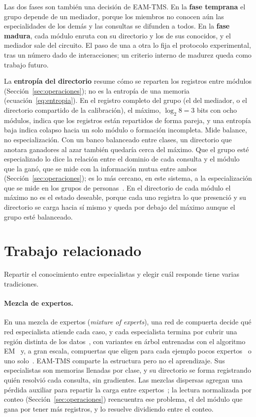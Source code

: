 Las dos fases son también una decisión de EAM-TMS.
En la \textbf{fase temprana} el grupo depende de un mediador, porque los miembros no
conocen aún las especialidades de los demás y las consultas se difunden a todos.
En la \textbf{fase madura}, cada módulo enruta con su directorio y los de sus
conocidos, y el mediador sale del circuito.
El paso de una a otra lo fija el protocolo experimental, tras un número dado de
interacciones; un criterio interno de madurez queda como trabajo futuro.

La \textbf{entropía del directorio} resume cómo se reparten los registros entre
módulos (Sección~\ref{sec:operaciones}); no es la entropía de una memoria
(ecuación~\eqref{eq:entropia}).
En el registro completo del grupo (el del mediador, o el directorio compartido de la
calibración), el máximo, $\log_2 8 = 3$ bits con ocho módulos, indica que los registros
están repartidos de forma pareja, y una entropía baja indica colapso hacia un solo
módulo o formación incompleta.
Mide balance, no especialización.
Con un banco balanceado entre clases, un directorio
que anotara ganadores al azar también quedaría cerca del máximo.
Que el grupo esté especializado lo dice la relación entre el dominio de cada consulta y
el módulo que la ganó, que se mide con la información mutua entre ambos
(Sección~\ref{sec:operaciones}); es lo más cercano, en este sistema, a la
especialización que se mide en los grupos de personas~\cite{austin2003transactive}.
En el directorio de cada módulo el máximo no es el estado deseable, porque cada uno
registra lo que presenció y su directorio se carga hacia sí mismo y queda por debajo del
máximo aunque el grupo esté balanceado.

\section{Trabajo relacionado}
\label{sec:trabajo-relacionado}

Repartir el conocimiento entre especialistas y elegir cuál responde tiene varias
tradiciones.

\paragraph{Mezcla de expertos.}
En una mezcla de expertos (\textit{mixture of experts}), una red de compuerta decide qué red
especialista atiende cada caso, y cada especialista termina por cubrir una región
distinta de los datos~\cite{jacobs1991adaptive}, con variantes en árbol entrenadas con el algoritmo
EM~\cite{jordan1994hierarchical} y, a gran escala, compuertas que eligen para cada
ejemplo pocos expertos~\cite{shazeer2017outrageously} o uno solo~\cite{fedus2022switch}.
EAM-TMS comparte la estructura pero no el aprendizaje.
Sus especialistas son memorias
llenadas por clase, y su directorio se forma registrando quién resolvió cada consulta,
sin gradientes.
Las mezclas dispersas agregan una pérdida auxiliar para repartir la carga entre
expertos~\cite{fedus2022switch}; la lectura normalizada por conteo
(Sección~\ref{sec:operaciones}) reencuentra ese problema, el del módulo que gana por
tener más registros, y lo resuelve dividiendo entre el conteo.


